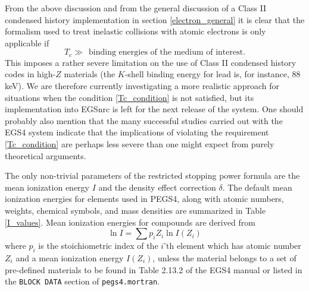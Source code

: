 From the above discussion and from the general discussion 
of a Class II condensed history implementation in section 
\ref{electron_general} it is clear that the formalism 
used to treat inelastic collisions with atomic electrons 
is only applicable if 
\begin{equation}
\label{Tc_condition}
T_c \gg ~~\text{binding energies of the medium of interest}. 
\end{equation}
This imposes a rather severe limitation on the use 
of Class II condensed history codes in high-$Z$ materials 
(the $K$-shell binding energy for lead is, for instance, 88 keV). 
We are therefore currently investigating a more realistic approach for 
situations when the condition \eqref{Tc_condition} is not 
satisfied, but its implementation into EGSnrc is left for the 
next release of the system. One should probably also mention 
that the many successful studies carried out with the 
EGS4 system indicate that the implications of violating 
the requirement \eqref{Tc_condition} are perhaps less 
severe than one might expect from purely theoretical arguments.

The only non-trivial parameters of the restricted stopping 
power formula are the mean ionization energy $I$ and the 
density effect correction $\delta$. The default mean ionization 
energies for elements used in PEGS4, along with atomic numbers, 
weights, chemical symbols, and mass densities are summarized 
in Table \ref{I_values}. Mean ionization energies for 
compounds are derived from
\begin{equation}
\ln I = \sum p_i Z_i \ln I(Z_i)
\end{equation}
where $p_i$ is the stoichiometric index of the $i$'th element 
which has atomic number $Z_i$ and a mean ionization energy $I(Z_i)$, 
unless the material belongs to a set of pre-defined materials 
to be found in Table 2.13.2 of the EGS4 manual \cite{Ne85} or listed in the
{\tt BLOCK DATA} section of {\tt pegs4.mortran}. 

